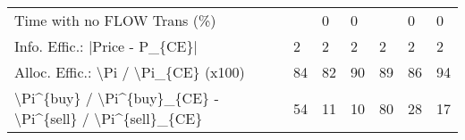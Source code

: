 \begin{tabular}{lllllll}
 Time with no FLOW Trans (\%)                               &          & 0        & 0        &           & 0         & 0         \\
 Info. Effic.: |Price - P\_\{CE\}|                            & 2        & 2        & 2        & 2         & 2         & 2         \\
 Alloc. Effic.: \textbackslash{}Pi / \textbackslash{}Pi\_\{CE\} (x100)                      & 84       & 82       & 90       & 89        & 86        & 94        \\
 \textbackslash{}Pi\^{}\{buy\} / \textbackslash{}Pi\^{}\{buy\}\_\{CE\} - \textbackslash{}Pi\^{}\{sell\} / \textbackslash{}Pi\^{}\{sell\}\_\{CE\} & 54       & 11       & 10       & 80        & 28        & 17        \\
\hline
\end{tabular}